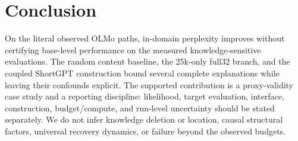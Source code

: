 \section{Conclusion}
\label{sec:conclusion}

On the literal observed OLMo paths, in-domain perplexity improves without
certifying base-level performance on the measured knowledge-sensitive
evaluations. The random content baseline, the 25k-only full32 branch, and the
coupled ShortGPT construction bound several complete explanations while leaving
their confounds explicit. The supported contribution is a proxy-validity case
study and a reporting discipline: likelihood, target evaluation, interface,
construction, budget/compute, and run-level uncertainty should be stated
separately. We do not infer knowledge deletion or location, causal structural
factors, universal recovery dynamics, or failure beyond the observed budgets.
